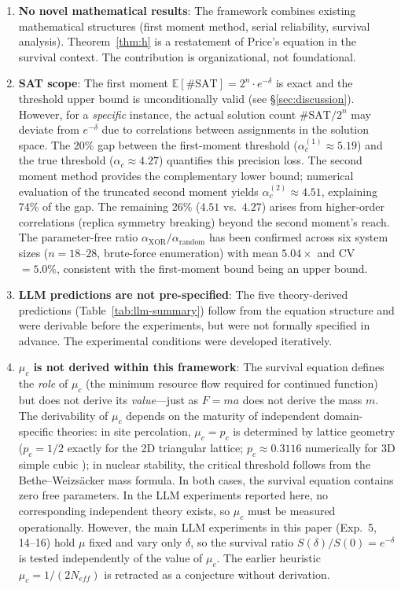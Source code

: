 \documentclass[11pt,a4paper]{article}
\begin{document}
\begin{enumerate}
    \item \textbf{No novel mathematical results}: The framework combines existing mathematical structures (first moment method, serial reliability, survival analysis). Theorem~\ref{thm:h} is a restatement of Price's equation in the survival context. The contribution is organizational, not foundational.

    \item \textbf{SAT scope}: The first moment $\mathbb{E}[\#\text{SAT}] = 2^n \cdot e^{-\delta}$ is exact and the threshold upper bound is unconditionally valid (see \S\ref{sec:discussion}). However, for a \emph{specific} instance, the actual solution count $\#\text{SAT}/2^n$ may deviate from $e^{-\delta}$ due to correlations between assignments in the solution space. The 20\% gap between the first-moment threshold ($\alpha_c^{(1)} \approx 5.19$) and the true threshold ($\alpha_c \approx 4.27$) quantifies this precision loss. The second moment method provides the complementary lower bound; numerical evaluation of the truncated second moment yields $\alpha_c^{(2)} \approx 4.51$, explaining 74\% of the gap. The remaining 26\% ($4.51$ vs.\ $4.27$) arises from higher-order correlations (replica symmetry breaking) beyond the second moment's reach. The parameter-free ratio $\alpha_{\text{XOR}}/\alpha_{\text{random}}$ has been confirmed across six system sizes ($n = 18$--$28$, brute-force enumeration) with mean $5.04\times$ and CV $= 5.0\%$, consistent with the first-moment bound being an upper bound.

    \item \textbf{LLM predictions are not pre-specified}: The five theory-derived predictions (Table~\ref{tab:llm-summary}) follow from the equation structure and were derivable before the experiments, but were not formally specified in advance. The experimental conditions were developed iteratively.

    \item \textbf{$\mu_c$ is not derived within this framework}: The survival equation defines the \emph{role} of $\mu_c$ (the minimum resource flow required for continued function) but does not derive its \emph{value}---just as $F = ma$ does not derive the mass $m$. The derivability of $\mu_c$ depends on the maturity of independent domain-specific theories: in site percolation, $\mu_c = p_c$ is determined by lattice geometry ($p_c = 1/2$ exactly for the 2D triangular lattice; $p_c \approx 0.3116$ numerically for 3D simple cubic \citep{mertens2002exact}); in nuclear stability, the critical threshold follows from the Bethe--Weizs\"{a}cker mass formula. In both cases, the survival equation contains zero free parameters. In the LLM experiments reported here, no corresponding independent theory exists, so $\mu_c$ must be measured operationally. However, the main LLM experiments in this paper (Exp.~5, 14--16) hold $\mu$ fixed and vary only $\delta$, so the survival ratio $S(\delta)/S(0) = e^{-\delta}$ is tested independently of the value of $\mu_c$. The earlier heuristic $\mu_c = 1/(2 N_{eff})$ is retracted as a conjecture without derivation.


\end{enumerate}
\end{document}
